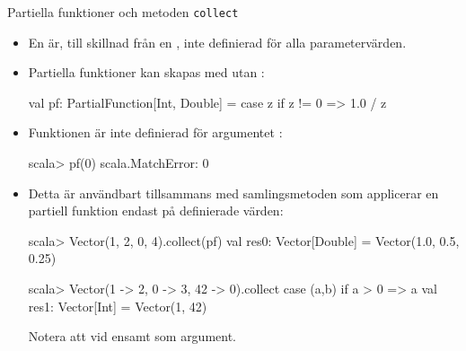 \begin{Slide}{Partiella funktioner och metoden \texttt{collect}}\SlideFontSmall
\begin{itemize}
\item En   är, till skillnad från en  , inte definierad för alla parametervärden.
\item Partiella funktioner kan skapas med  utan :
\begin{Code}
val pf: PartialFunction[Int, Double] = case z if z != 0 => 1.0 / z  
\end{Code}
\item  Funktionen är inte definierad för argumentet :

\begin{REPLsmall}
scala> pf(0)                         
scala.MatchError: 0 
\end{REPLsmall}
\item 
Detta är användbart tillsammans med samlingsmetoden  som  applicerar en partiell funktion endast på definierade värden: 
\begin{REPLsmall}
scala> Vector(1, 2, 0, 4).collect(pf)
val res0: Vector[Double] = Vector(1.0, 0.5, 0.25)

scala> Vector(1 -> 2, 0 -> 3, 42 -> 0).collect{ case (a,b) if a > 0 => a } 
val res1: Vector[Int] = Vector(1, 42)

\end{REPLsmall}
Notera att  vid ensamt  som argument.



\end{itemize}
\end{Slide}


